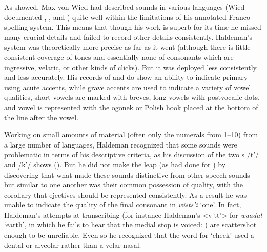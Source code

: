 \documentclass[output=paper]{LSP/langsci}
\begin{document}
As \citet{Rankin1994} showed, Max von Wied \citep{Maximilian18391841} had described sounds in various  languages (Wied documented , ,  and ) quite well within the limitations of his annotated Franco- spelling system. This means that though his work is superb for its time he missed many crucial details and failed to record other details consistently.   Haldeman's system was theoretically more precise as far as it went (although there is little consistent coverage of tones and essentially none of consonants which are ingressive, velaric, or other kinds of clicks). But it was deployed less consistently and less accurately.   His records of  and  do show an ability to indicate primary  using acute accents, while grave accents are used to indicate a variety of vowel qualities, short vowels are marked with breves, long vowels with postvocalic dots, and vowel  is represented with the ogonek or Polish hook placed at the bottom of the line after the vowel.  
 

Working on small amounts of material (often only the numerals from 1--10) from a large number of languages, Haldeman recognized that some sounds were problematic in terms of his descriptive criteria, as his discussion of the two s   /t'/ and  /k'/ shows (\citealt[99: \S448; 131: \S574]{Haldeman1860}).  But he did not make the leap (as \citealt{Garcia1760} had done for ) by discovering that what made these sounds distinctive from other speech sounds but similar to one another was their common possession of  quality, with the corollary that ejectives should be represented consistently.  As a result he was unable to indicate the  quality of the final consonant in  \textit{wists'i} `one'.  In fact, Haldeman's attempts at transcribing  (for instance Haldeman's <v\'{}tt'> for \textit{waadat} `earth', in which he fails to hear that the medial stop is voiced: \citealt[135, \S633]{Haldeman1860}) are scattershot enough to be unreliable. Even so he recognized that the  word for `cheek'  used a dental or alveolar rather than a velar nasal.    
\end{document}
